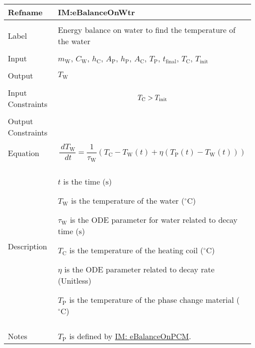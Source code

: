 \documentclass[12pt]{article}
\newcommand{\gt}{\ensuremath >}
\begin{document}
\vspace{\baselineskip}
\noindent
\begin{minipage}{\textwidth}
\begin{tabular}{>{\raggedright}p{}>{\raggedright\arraybackslash}p{}}
\toprule \textbf{Refname} & \textbf{IM:eBalanceOnWtr}
\label{IM:eBalanceOnWtr}
\\ \midrule \\
Label & Energy balance on water to find the temperature of the water
        
\\ \midrule \\
Input & ${m_{\text{W}}}$, ${C_{\text{W}}}$, ${h_{\text{C}}}$, ${A_{\text{P}}}$, ${h_{\text{P}}}$, ${A_{\text{C}}}$, ${T_{\text{P}}}$, ${t_{\text{final}}}$, ${T_{\text{C}}}$, ${T_{\text{init}}}$
        
\\ \midrule \\
Output & ${T_{\text{W}}}$
         
\\ \midrule \\
Input Constraints & \begin{displaymath}
                    {T_{\text{C}}}\gt{}{T_{\text{init}}}
                    \end{displaymath}
\\ \midrule \\
Output Constraints & 
\\ \midrule \\
Equation & \begin{displaymath}
           \frac{\,d{T_{\text{W}}}}{\,dt}=\frac{1}{{τ_{\text{W}}}} \left({T_{\text{C}}}-{T_{\text{W}}}\left(t\right)+η \left({T_{\text{P}}}\left(t\right)-{T_{\text{W}}}\left(t\right)\right)\right)
           \end{displaymath}
\\ \midrule \\
Description & \begin{symbDescription}
              \item{$t$ is the time (${\text{s}}$)}
              \item{${T_{\text{W}}}$ is the temperature of the water (${{}^{\circ}\text{C}}$)}
              \item{${τ_{\text{W}}}$ is the ODE parameter for water related to decay time (${\text{s}}$)}
              \item{${T_{\text{C}}}$ is the temperature of the heating coil (${{}^{\circ}\text{C}}$)}
              \item{$η$ is the ODE parameter related to decay rate (Unitless)}
              \item{${T_{\text{P}}}$ is the temperature of the phase change material (${{}^{\circ}\text{C}}$)}
              \end{symbDescription}
\\ \midrule \\
Notes & ${T_{\text{P}}}$ is defined by \hyperref[IM:eBalanceOnPCM]{IM: eBalanceOnPCM}.
        

\end{tabular}
\end{minipage}
\end{document}
